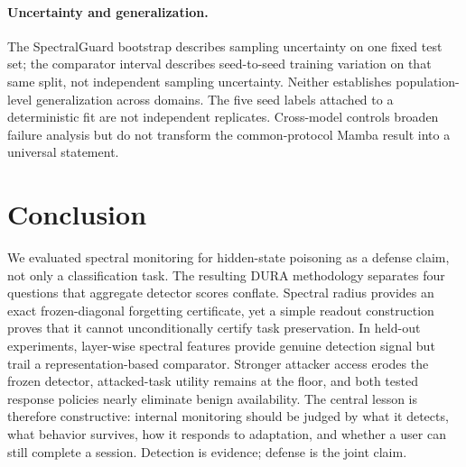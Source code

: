 \documentclass[sigconf]{acmart}
\begin{document}
\paragraph{Uncertainty and generalization.}
The SpectralGuard bootstrap describes sampling uncertainty on one fixed test
set; the comparator interval describes seed-to-seed training variation on that
same split, not independent sampling uncertainty. Neither establishes
population-level generalization across domains.
The five seed labels attached to a deterministic fit are not independent
replicates. Cross-model controls broaden failure analysis but do not transform
the common-protocol Mamba result into a universal statement.

\section{Conclusion}
We evaluated spectral monitoring for hidden-state poisoning as a defense claim,
not only a classification task. The resulting DURA methodology separates four
questions that aggregate detector scores conflate. Spectral radius provides an
exact frozen-diagonal forgetting certificate, yet a simple readout construction
proves that it cannot unconditionally certify task preservation. In held-out
experiments, layer-wise spectral features provide genuine detection signal but
trail a representation-based comparator. Stronger attacker access erodes the
frozen detector, attacked-task utility remains at the floor, and both tested
response policies nearly eliminate benign availability. The central lesson is
therefore constructive: internal monitoring should be judged by what it
detects, what behavior survives, how it responds to adaptation, and whether a
user can still complete a session. Detection is evidence; defense is the joint
claim.



\end{document}

